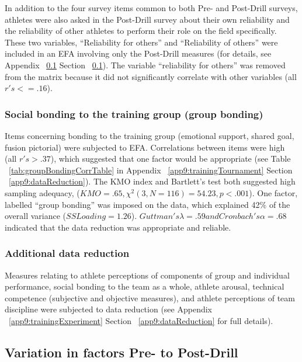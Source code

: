 In addition to the four survey items common to both Pre- and Post-Drill surveys, athletes were also asked in the Post-Drill survey about their own reliability and the reliability of other athletes to perform their role on the field specifically. These two variables, ``Reliability for others'' and ``Reliability of others'' were included in an EFA involving only the Post-Drill measures (for details, see Appendix ~\ref{} Section ~\ref{}).  The variable ``reliability for others'' was removed from the matrix because it did not significantly correlate with other variables (all $r's <= .16$).


\subsubsection{Social bonding to the training group (group bonding)}
Items concerning bonding to the training group (emotional support, shared goal, fusion pictorial) were subjected to EFA.  Correlations between items were high (all $r's > .37$), which suggested that one factor would be appropriate (see Table ~\ref{tab:groupBondingCorrTable} in Appendix ~\ref{app9:trainingTournament} Section ~\ref{app9:dataReduction}). The KMO index and Bartlett's test both suggested high sampling adequacy, ($KMO =  .65, \chi^2(3, N = 116) = 54.23, p < .001$).
One factor, labelled ``group bonding'' was imposed on the data, which explained 42\% of the overall variance ($SS Loading = 1.26$). $Guttman's \lambda = .59 and Cronbach's \alpha = .68$ indicated that the data reduction was appropriate and reliable.

\subsubsection{Additional data reduction}
Measures relating to athlete perceptions of components of group and individual performance, social bonding to the team as a whole, athlete arousal, technical competence (subjective and objective measures), and athlete perceptions of team discipline were subjected to data reduction (see Appendix ~\ref{app9:trainingExperiment} Section ~\ref{app9:dataReduction} for full details).






\subsection{Variation in factors Pre- to Post-Drill}



